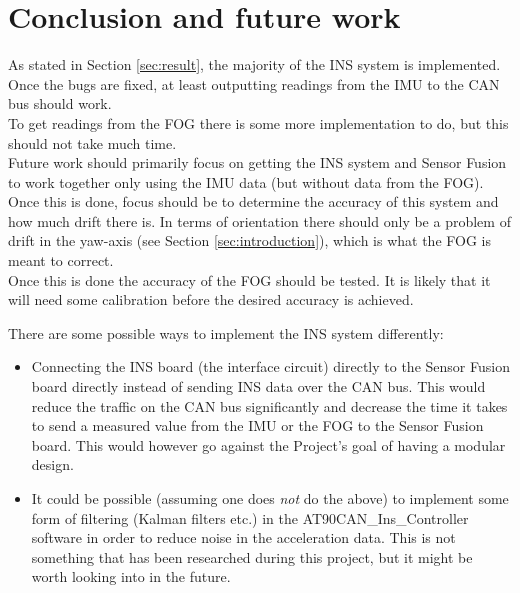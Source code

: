 \section{Conclusion and future work}\label{sec:conclusion}
As stated in Section \ref{sec:result}, the majority of the INS system is implemented. Once the bugs are fixed, at least outputting readings from the IMU to the CAN bus should work. \\
To get readings from the FOG there is some more implementation to do, but this should not take much time. \\ %
Future work should primarily focus on getting the INS system and Sensor Fusion to work together only using the IMU data (but without data from the FOG). Once this is done, focus should be to determine the accuracy of this system and how much drift there is. In terms of orientation there should only be a problem of drift in the yaw-axis (see Section \ref{sec:introduction}), which is what the FOG is meant to correct. \\
Once this is done the accuracy of the FOG should be tested. It is likely that it will need some calibration before the desired accuracy is achieved.
\pagebreak

There are some possible ways to implement the INS system differently:

\begin{itemize}
\item Connecting the INS board (the interface circuit) directly to the Sensor Fusion board directly instead of sending INS data over the CAN bus. This would reduce the traffic on the CAN bus significantly and decrease the time it takes to send a measured value from the IMU or the FOG to the Sensor Fusion board. This would however go against the Project's goal of having a modular design.

\item It could be possible (assuming one does \emph{not} do the above) to implement some form of filtering (Kalman filters etc.) in the AT90CAN\_Ins\_Controller software in order to reduce noise in the acceleration data. This is not something that has been researched during this project, but it might be worth looking into in the future.

\end{itemize}




